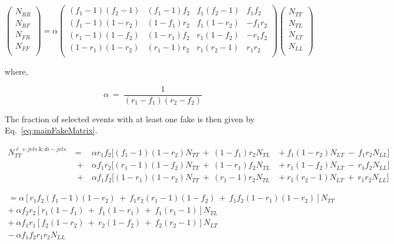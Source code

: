 \begin{equation}
   \begin{pmatrix}
      N_{RR} \\
      N_{RF} \\
      N_{FR} \\
      N_{FF} \\
   \end{pmatrix}
   = \alpha
   \begin{pmatrix}
      (f_{1}-1)(f_{2}-1) & (f_{1}-1)f_{2} & f_{1}(f_{2}-1) & f_{1}f_{2} \\
      (f_{1}-1)(1-r_{2}) & (1-f_{1})r_{2} & f_{1}(1-r_{2}) & -f_{1}r_{2} \\
      (r_{1}-1)(1-f_{2}) & (1-r_{1})f_{2} & r_{1}(1-f_{2}) & -r_{1}f_{2} \\
      (1-r_{1})(1-r_{2}) & (r_{1}-1)r_{2} & r_{1}(r_{2}-1) & r_{1}r_{2} \\
   \end{pmatrix}
   \begin{pmatrix}
      N_{TT} \\
      N_{TL} \\
      N_{LT} \\
      N_{LL} \\
   \end{pmatrix}
\end{equation}

where,

\begin{equation}
   \alpha~=~\frac{1}{(r_{1}-f_{1})(r_{2}-f_{2})}
\end{equation}

The fraction of selected events with at least one fake is then given by Eq.~\ref{eq:mainFakeMatrix}.

\begin{equation}
\begin{aligned}
   N^{\ell+jets~\&~di-jets}_{TT}~&=&~\alpha r_{1}f_{2}[(f_{1}-1)(1-r_{2})N_{TT}~+~(1-f_{1})r_{2}N_{TL}~&+~f_{1}(1-r_{2})N_{LT}~-~f_{1}r_{2}N_{LL}] \\
      &~+&~\alpha f_{1}r_{2}[(r_{1}-1)(1-f_{2})N_{TT}~+~(1-r_{1})f_{2}N_{TL}~&+~r_{1}(1-f_{2})N_{LT}~-~r_{1}f_{2}N_{LL}] \\
      &~+&~\alpha f_{1}f_{2}[(1-r_{1})(1-r_{2})N_{TT}~+~(r_{1}-1)r_{2}N_{TL}~&+~r_{1}(r_{2}-1)N_{LT}~+~r_{1}r_{2}N_{LL}] 
\end{aligned}
\end{equation}

\begin{equation} \label{eq:mainFakeResult}
\begin{aligned}
   =\alpha[r_{1}f_{2}(f_{1}-1)(1-r_{2})~+~f_{1}r_{2}(r_{1}-1)(1-f_{2})~+~f_{1}f_{2}(1-r_{1})(1-r_{2})]N_{TT} \\
   +~\alpha f_{2}r_{2}[r_{1}(1-f_{1})~+~f_{1}(1-r_{1})~+~f_{1}(r_{1}-1)]N_{TL} \\
   +~\alpha f_{1}r_{1}[f_{2}(1-r_{2})~+~r_{2}(1-f_{2})~+~f_{2}(r_{2}-1)]N_{LT} \\
   -~\alpha f_{1}f_{2}r_{1}r_{2}N_{LL}
\end{aligned}
\end{equation}

